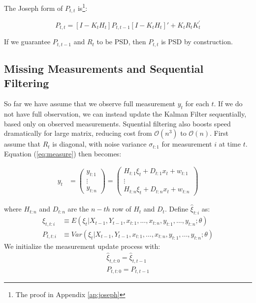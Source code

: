 \documentclass[12pt]{article}
\numberwithin{equation}{section}
\begin{document}
The Joseph form of $P_{t,t}$ is\footnote{The proof in Appendix \ref{ap:joseph}}:

\[
    P_{t,t} = [I - K_tH_t]P_{t,t-1}[I - K_tH_t]' + K_tR_tK_t^{'}    
\]

If we guarantee $P_{t,t-1}$ and $R_t$ to be PSD, then $P_{t,t}$ is PSD by construction. 

\subsection{Missing Measurements and Sequential Filtering}

So far we have assume that we observe full measurement $y_t$ for each $t$. If we do not have full observation, we can instead update the Kalman Filter sequentially, based only on observed measurements. Squential filtering also boosts speed dramatically for large matrix, reducing cost from $\mathcal{O}(n^3)$ to $\mathcal{O}(n)$. First assume that $R_t$ is diagonal, with noise variance $\sigma_{t:1}$ for measurement $i$ at time $t$. Equation (\ref{eq:measure}) then becomes:

\begin{align*}
    y_t &= 
    \begin{pmatrix}
        y_{t:1} \\
        \vdots \\ 
        y_{t:n}
    \end{pmatrix} 
    = \begin{pmatrix}
        H_{t:1}\xi_t + D_{t:1}x_t + w_{t:1} \\
        \vdots \\
        H_{t:n}\xi_t + D_{t:n}x_t + w_{t:n}
    \end{pmatrix}
\end{align*}

where $H_{t:n}$ and $D_{t:n}$ are the $n-th$ row of $H_t$ and $D_t$. Define $\hat{\xi}_{t:i}$ as:
\begin{align*}
    \hat{\xi}_{t,t:i} &\equiv E(\xi_t|X_{t-1},Y_{t-1},x_{t:1},...,x_{t:n},y_{t:1},...,y_{t:n};\theta) \\
    P_{t,t:i} &\equiv Var(\xi_t|X_{t-1},Y_{t-1},x_{t:1},...,x_{t:n},y_{t:1},...,y_{t:n};\theta) 
\end{align*}
We initialize the measurement update process with:
\begin{align}
    \hat{\xi}_{t,t:0} = \hat{\xi}_{t,t-1} \label{eq:seq_init1} \\
    P_{t,t:0} = P_{t,t-1} \label{eq:seq_init2}
\end{align}
\end{document}
